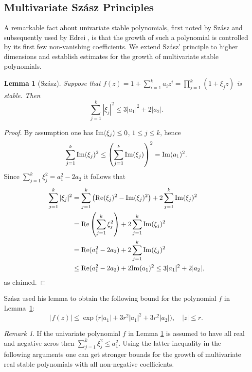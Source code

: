 \documentclass[10pt,reqno]{amsart}
\theoremstyle{plain}
\newtheorem{lemma}[theorem]{Lemma}
\theoremstyle{definition}
\theoremstyle{remark}
\newtheorem{remark}{Remark}[section]
\numberwithin{equation}{section}
\renewcommand{\Im}{{\rm Im}}
\renewcommand{\Re}{{\rm Re}}
\begin{document}
{\subsection{Multivariate Sz\'asz Principles}\label{ss-81}

A remarkable fact about univariate stable polynomials, first noted by
Sz\'asz \cite{szasz} and subsequently used by Edrei \cite{edrei}, is
that the growth of such a polynomial is controlled by its first few 
non-vanishing coefficients. We extend Sz\'asz' principle
to higher dimensions and establish estimates for the growth of 
multivariate stable polynomials.

\begin{lemma}[Sz\'asz]\label{l-sz}Suppose that 
$f(z)= 1+\sum_{i=1}^{k}a_iz^i=\prod_{j=1}^k (1+\xi_j z)
$
is stable. 
Then 
$$
\sum_{j=1}^k|\xi_j|^2 \leq 3|a_1|^2+2|a_2|. 
$$
\end{lemma} 

\begin{proof}
By assumption one has $\Im(\xi_j)\le 0$, $1\le j\le k$, hence
$$
\sum_{j=1}^{k}\Im(\xi_j)^2\le \left(\sum_{j=1}^{k}\Im(\xi_j)\right)^2
=\Im(a_1)^2.
$$
Since $\sum_{j=1}^{k}\xi_j^2=a_1^2-2a_2$ it follows that
\begin{equation*}
\begin{split}
\sum_{j=1}^k|\xi_j|^2&=\sum_{j=1}^k\left(\Re(\xi_j)^2-\Im(\xi_j)^2\right)
+2\sum_{j=1}^k\Im(\xi_j)^2\\
&=\Re\left(\sum_{j=1}^{k}\xi_j^2\right)+2\sum_{j=1}^k\Im(\xi_j)^2\\
&=\Re(a_1^2-2a_2)+2\sum_{j=1}^k\Im(\xi_j)^2\\
&\le \Re(a_1^2-2a_2)+2\Im(a_1)^2\le 3|a_1|^2+2|a_2|,
\end{split}
\end{equation*}
as claimed.
\end{proof}

Sz\'asz used his lemma to obtain the following bound for the polynomial $f$ 
in Lemma~\ref{l-sz}: 
$$
|f(z)| \leq \exp \Big( r|a_1|+ 3r^2 |a_1|^2+3r^2|a_2|  \Big), \quad |z|\leq r. 
$$

\begin{remark}
If the univariate polynomial $f$ in Lemma \ref{l-sz} is assumed to have all 
real and negative zeros then $\sum_{j=1}^k \xi_j^2 \leq a_1^2$.
Using the latter inequality in the following arguments one can get
stronger bounds for the growth of multivariate real stable polynomials with
all non-negative coefficients.
\end{remark}

}
\end{document}
